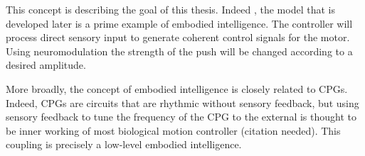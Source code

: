 This concept is describing the goal of this thesis. Indeed , the model that is developed later is a prime example of embodied intelligence. The controller will process direct sensory input to generate coherent control signals for the motor. Using neuromodulation the strength of the push will be changed according to a desired amplitude.

More broadly, the concept of embodied intelligence is closely related to CPGs. Indeed, CPGs are circuits that are rhythmic without sensory feedback, but using sensory feedback to tune the frequency of the CPG to the external is thought to be inner working of most biological motion controller (citation needed). This coupling is precisely a low-level embodied intelligence. 

